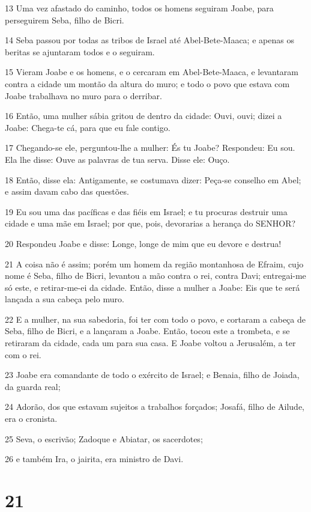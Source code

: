 \par 13 Uma vez afastado do caminho, todos os homens seguiram Joabe, para perseguirem Seba, filho de Bicri.
\par 14 Seba passou por todas as tribos de Israel até Abel-Bete-Maaca; e apenas os beritas se ajuntaram todos e o seguiram.
\par 15 Vieram Joabe e os homens, e o cercaram em Abel-Bete-Maaca, e levantaram contra a cidade um montão da altura do muro; e todo o povo que estava com Joabe trabalhava no muro para o derribar.
\par 16 Então, uma mulher sábia gritou de dentro da cidade: Ouvi, ouvi; dizei a Joabe: Chega-te cá, para que eu fale contigo.
\par 17 Chegando-se ele, perguntou-lhe a mulher: És tu Joabe? Respondeu: Eu sou. Ela lhe disse: Ouve as palavras de tua serva. Disse ele: Ouço.
\par 18 Então, disse ela: Antigamente, se costumava dizer: Peça-se conselho em Abel; e assim davam cabo das questões.
\par 19 Eu sou uma das pacíficas e das fiéis em Israel; e tu procuras destruir uma cidade e uma mãe em Israel; por que, pois, devorarias a herança do SENHOR?
\par 20 Respondeu Joabe e disse: Longe, longe de mim que eu devore e destrua!
\par 21 A coisa não é assim; porém um homem da região montanhosa de Efraim, cujo nome é Seba, filho de Bicri, levantou a mão contra o rei, contra Davi; entregai-me só este, e retirar-me-ei da cidade. Então, disse a mulher a Joabe: Eis que te será lançada a sua cabeça pelo muro.
\par 22 E a mulher, na sua sabedoria, foi ter com todo o povo, e cortaram a cabeça de Seba, filho de Bicri, e a lançaram a Joabe. Então, tocou este a trombeta, e se retiraram da cidade, cada um para sua casa. E Joabe voltou a Jerusalém, a ter com o rei.
\par 23 Joabe era comandante de todo o exército de Israel; e Benaia, filho de Joiada, da guarda real;
\par 24 Adorão, dos que estavam sujeitos a trabalhos forçados; Josafá, filho de Ailude, era o cronista.
\par 25 Seva, o escrivão; Zadoque e Abiatar, os sacerdotes;
\par 26 e também Ira, o jairita, era ministro de Davi.

\chapter{21}

